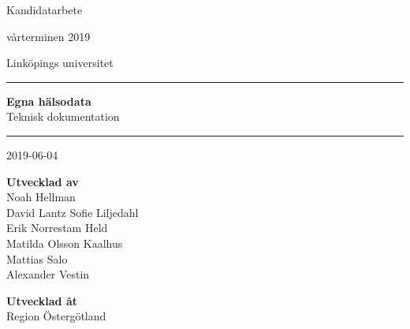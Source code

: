 \begin{titlepage}
\begin{center}
    \vspace*{1cm}

    {\LARGE \sc Kandidatarbete}

    \vspace*{1cm}

    {\large \sc vårterminen 2019}

    \vspace*{1cm}

    {\LARGE \sc Linköpings universitet}

    \vspace*{3cm}

    \hrule
    \vspace{8mm}
    {\bfseries \Huge Egna hälsodata}\\
    \vspace{6mm}
    {\sc \LARGE Teknisk dokumentation}\\
    \vspace{11mm}
    \hrule

    \vspace{3cm}
    {\LARGE 2019-06-04}\\
    \vspace{3cm}

    \begin{minipage}{0.5\textwidth}
        \large
        \begin{flushleft}
            {\bfseries Utvecklad av}\\ %
            \sc
            Noah Hellman\\
            David Lantz
            Sofie Liljedahl\\
            Erik Norrestam Held\\
            Matilda Olsson Kaalhus\\
            Mattias Salo\\
            Alexander Vestin\\
        \end{flushleft}
    \end{minipage}
    \begin{minipage}{0.49\textwidth}
        \large
        \begin{flushright}
            {\bfseries Utvecklad åt}\\
            Region Östergötland
        \end{flushright}
    \end{minipage}

    \vfill
\end{center}
\end{titlepage}
